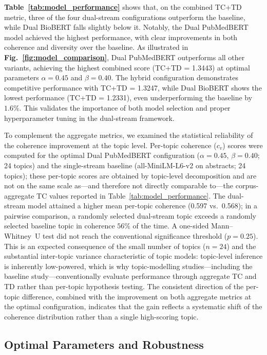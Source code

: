 \documentclass[authorproof,JACIII,researchpaper]{fujipressarticle}
\begin{document}
\textbf{Table~\ref{tab:model_performance}} shows that, on the combined TC+TD metric, three of the four dual-stream configurations outperform the baseline, while Dual BioBERT falls slightly below it. Notably, the Dual PubMedBERT model achieved the highest performance, with clear improvements in both coherence and diversity over the baseline. As illustrated in \textbf{Fig.~\ref{fig:model_comparison}}, Dual PubMedBERT outperforms all other variants, achieving the highest combined score (TC+TD = 1.3443) at optimal parameters $\alpha=0.45$ and $\beta=0.40$. The hybrid configuration demonstrates competitive performance with TC+TD = 1.3247, while Dual BioBERT shows the lowest performance (TC+TD = 1.2331), even underperforming the baseline by $1.6\%$. This validates the importance of both model selection and proper hyperparameter tuning in the dual-stream framework.

To complement the aggregate metrics, we examined the statistical reliability of the coherence improvement at the topic level. Per-topic coherence ($c_v$) scores were computed for the optimal Dual PubMedBERT configuration ($\alpha=0.45$, $\beta=0.40$; 24 topics) and the single-stream baseline (all-MiniLM-L6-v2 on abstracts; 24 topics); these per-topic scores are obtained by topic-level decomposition and are not on the same scale as---and therefore not directly comparable to---the corpus-aggregate TC values reported in Table~\ref{tab:model_performance}. The dual-stream model attained a higher mean per-topic coherence (0.597 vs.\ 0.568); in a pairwise comparison, a randomly selected dual-stream topic exceeds a randomly selected baseline topic in coherence $56\%$ of the time. A one-sided Mann--Whitney~U test did not reach the conventional significance threshold ($p=0.25$). This is an expected consequence of the small number of topics ($n=24$) and the substantial inter-topic variance characteristic of topic models: topic-level inference is inherently low-powered, which is why topic-modelling studies---including the baseline study---conventionally evaluate performance through aggregate TC and TD rather than per-topic hypothesis testing. The consistent direction of the per-topic difference, combined with the improvement on both aggregate metrics at the optimal configuration, indicates that the gain reflects a systematic shift of the coherence distribution rather than a single high-scoring topic.

\subsection{Optimal Parameters and Robustness}
\end{document}
